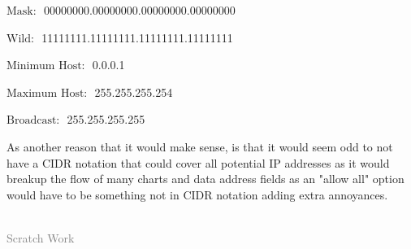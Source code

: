 \documentclass[12pt,addpoints,answers]{exam}
\begin{document}
\begin{questions}
\begin{solution}[1in]
\begin{center}
		$\textrm{Mask: }$ 00000000.00000000.00000000.00000000
		
		$\textrm{Wild: }$ 11111111.11111111.11111111.11111111
		
		$\textrm{Minimum Host: }$ 0.0.0.1
		
		$\textrm{Maximum Host: }$ 255.255.255.254
		
		$\textrm{Broadcast: }$ 255.255.255.255
	\end{center}
	As another reason that it would make sense, is that it would seem odd to not have a CIDR notation that could cover all potential IP addresses as it would breakup the flow of many charts and data address fields as an "allow all" option would have to be something not in CIDR notation adding extra annoyances.
\end{solution}
\end{questions}

\newpage
\begin{center}\hrulefill\\\textcolor{gray}{Scratch Work}\end{center}
\vfill
\begin{center}\gradetable[v][questions]\end{center}
\end{document}
